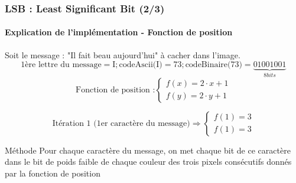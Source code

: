 \documentclass{beamer}
\begin{document}
\begin{frame}
\frametitle{LSB : Least Significant Bit (2/3)}
\framesubtitle{Explication de l'implémentation \-- \textbf{Fonction de position}}
\vspace{0.5cm}
Soit le message : "Il fait beau aujourd'hui" à cacher dans l'image.
\[ \text{1ère lettre du message} = \text{I} ; \text{codeAscii(I)} = 73 ; \text{codeBinaire(} 73 \text{)} = \underbrace{01001001}_{8 bits} \]
\[ \text{Fonction de position :} \left\{\begin{array}{ll}
f(x) = 2 \cdot x + 1 \\
f(y) = 2 \cdot y + 1
\end{array}\right. \]

\[ \text{Itération 1 (1er caractère du message)} \Rightarrow \left\{\begin{array}{ll}
f(1) = 3 \\
f(1) = 3
\end{array}\right. \]

\begin{alertblock}{Méthode}
Pour chaque caractère du message, on met chaque bit de ce caractère dans le bit de poids faible de chaque couleur des trois pixels consécutifs donnés par la fonction de position
\end{alertblock}
\end{frame}
\end{document}
